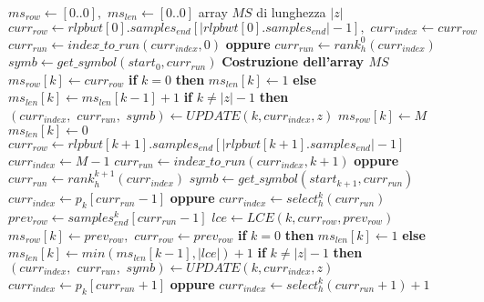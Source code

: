 \begin{algorithm}
  \scriptsize
  \begin{algorithmic}[1]
    \State $ms_{row}\gets [0..0],\,\,ms_{len}\gets [0..0]$
    \Comment array $MS$ di lunghezza $|z|$
    \State $curr_{row}\gets
    rlpbwt[0].samples_{end}[|rlpbwt[0].samples_{end}|-1],\,\,curr_{index}\gets
    curr_{row}$ 
    \State $curr_{run}\gets index\_to\_run(curr_{index},0)$ \textbf{oppure}
    $curr_{run}\gets rank_h^0(curr_{index})$  
    \State $symb\gets get\_symbol(start_0, curr_{run})$
    \Comment \textbf{Costruzione dell'array $MS$}
    \For {\textit{every} $k\in[0, |z|)$}
    \State $ms_{row}[k]\gets curr_{row}$
    \State \textbf{if} $k=0$ \textbf{then} $ms_{len}[k] \gets 1$ \textbf{else}
    $ms_{len}[k] \gets ms_{len}[k-1]+1$
    \State \hspace{-1.1mm}\textbf{if} $k\neq |z|-1$ \textbf{then}
    $(curr_{index},\,\,curr_{run},\,\,symb)\gets UPDATE(k, curr_{index},z)$ 
    \Else
    \State $ms_{row}[k]\gets M$
    \State $ms_{len}[k]\gets 0$
    \State $curr_{row}\gets
    rlpbwt[k+1].samples_{end}[|rlpbwt[k+1].samples_{end}|-1]$
    \State $curr_{index}\gets M-1$
    \State $curr_{run}\gets index\_to\_run(curr_{index},k+1)$ \textbf{oppure}
    $curr_{run}\gets rank_h^{k+1}(curr_{index})$
    \State $symb\gets get\_symbol(start_{k+1}, curr_{run})$
    \EndIf
    \Else
    \State $curr_{index}\gets p_k[curr_{run}-1]$ \textbf{oppure}
    $curr_{index}\gets select_h^k(curr_{run})$
    \State $prev_{row}\gets
    samples_{end}^k[curr_{run}-1]$ 
    \State $lce\gets LCE(k, curr_{row}, prev_{row})$
    \State $ms_{row}[k]\gets prev_{row},\,\,curr_{row}\gets prev_{row}$
    \State \textbf{if} $k=0$ \textbf{then} $ms_{len}[k] \gets 1$ \textbf{else}
    $ms_{len}[k] \gets min(ms_{len}[k-1], |lce|)+1$ 
    \State \textbf{if} $k\neq |z|-1$ \textbf{then}
    $(curr_{index},\,\,curr_{run},\,\,symb)\gets UPDATE(k, curr_{index},z)$  
    \State $curr_{index}\gets p_k[curr_{run}+1]$ \textbf{oppure}
    $curr_{index}\gets select_h^k(curr_{run}+1)+1$

\end{algorithmic}
\end{algorithm}
